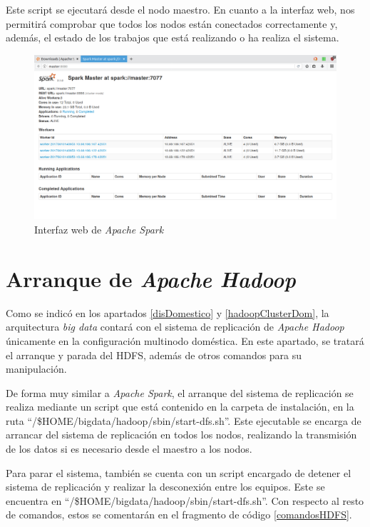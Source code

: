 Este script se ejecutará desde el nodo maestro. En cuanto a la interfaz web, nos permitirá comprobar que todos los nodos están conectados correctamente y, además, el estado de los trabajos que está realizando o ha realiza el sistema.

\begin{figure}[htp!]
\centering
\caption{Interfaz web de \textit{Apache Spark}}
\label{fig:interfazSpark}
\includegraphics[scale=0.3]{graphics/clusterDom}
\end{figure}

\section{Arranque de \textit{Apache Hadoop}}
Como se indicó en los apartados \ref{disDomestico} y \ref{hadoopClusterDom}, la arquitectura \textit{big data} contará con el sistema de replicación de \textit{Apache Hadoop} únicamente en la configuración multinodo doméstica. En este apartado, se tratará el arranque y parada del \gls{HDFS}, además de otros comandos para su manipulación.

De forma muy similar a \textit{Apache Spark}, el arranque del sistema de replicación se realiza mediante un script que está contenido en la carpeta de instalación, en la ruta ``/\$HOME/bigdata/hadoop/sbin/start-dfs.sh''. Este ejecutable se encarga de arrancar del sistema de replicación en todos los nodos, realizando la transmisión de los datos si es necesario desde el maestro a los nodos.

Para parar el sistema, también se cuenta con un script encargado de detener el sistema de replicación y realizar la desconexión entre los equipos. Este se encuentra en ``/\$HOME/bigdata/hadoop/sbin/start-dfs.sh''. Con respecto al resto de comandos, estos se comentarán en el fragmento de código \ref{comandosHDFS}.

